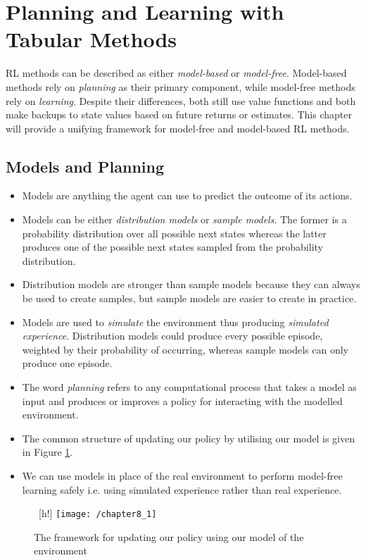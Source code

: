 \section{Planning and Learning with Tabular Methods}
RL methods can be described as either \textit{model-based} or \textit{model-free}. Model-based methods rely on \textit{planning} as their primary component, while model-free methods rely on \textit{learning}. Despite their differences, both still use value functions and both make backups to state values based on future returns or estimates. This chapter will provide a unifying framework for model-free and model-based RL methods.

\subsection{Models and Planning}
\begin{itemize}
	\item Models are anything the agent can use to predict the outcome of its actions.
	\item Models can be either \textit{distribution models} or \textit{sample models}. The former is a probability distribution over all possible next states whereas the latter produces one of the possible next states sampled from the probability distribution.
	\item Distribution models are stronger than sample models because they can always be used to create samples, but sample models are easier to create in practice.
	\item Models are used to \textit{simulate} the environment thus producing \textit{simulated experience}. Distribution models could produce every possible episode, weighted by their probability of occurring, whereas sample models can only produce one episode.
	\item The word \textit{planning} refers to any computational process that takes a model as input and produces or improves a policy for interacting with the modelled environment.
	\item The common structure of updating our policy by utilising our model is given in Figure \ref{fig: updating policy using model}.
	\item We can use models in place of the real environment to perform model-free learning safely i.e. using simulated experience rather than real experience.
\end{itemize}

\begin{figure} [h!]
	\centering
	\texttt{[image: /chapter8\_1]}
	\caption{The framework for updating our policy using our model of the environment}
	\label{fig: updating policy using model}
\end{figure}

